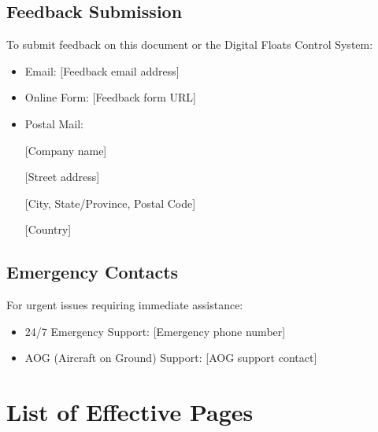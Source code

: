 \documentclass[12pt,a4paper,twoside,openright]{book}
\begin{document}
\subsection{Feedback Submission}

To submit feedback on this document or the Digital Floats Control System:

\begin{itemize}
    \item Email: {\color{missingred}[Feedback email address]}
    \item Online Form: {\color{missingred}[Feedback form URL]}
    \item Postal Mail:
    
    {\color{missingred}[Company name]}
    
    {\color{missingred}[Street address]}
    
    {\color{missingred}[City, State/Province, Postal Code]}
    
    {\color{missingred}[Country]}
\end{itemize}

\subsection{Emergency Contacts}

For urgent issues requiring immediate assistance:

\begin{itemize}
    \item 24/7 Emergency Support: {\color{missingred}[Emergency phone number]}
    \item AOG (Aircraft on Ground) Support: {\color{missingred}[AOG support contact]}
\end{itemize}

\section{List of Effective Pages}
\end{document}
